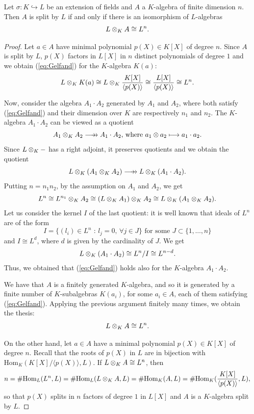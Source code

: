 \begin{proposition}
\label{prop:Gelfand}
    Let $\sigma:K\hookrightarrow L$ be an extension of fields and $A$ a $K$-algebra of finite dimension $n$. Then $A$ is split by $L$ if and only if there is an isomorphism of $L$-algebras
    \begin{equation}
    \label{eq:Gelfand}
        L\otimes_{K}A\cong L^n.    
    \end{equation}
    \begin{proof}
        Let $a\in A$ have minimal polynomial $p(X)\in K[X]$ of degree $n$. Since $A$ is split by $L$, $p(X)$ factors in $L[X]$ in $n$ distinct polynomials of degree $1$ and we obtain (\ref{eq:Gelfand}) for the $K$-algebra $K(a)$:
        \[ L\otimes_{K}K(a)\cong L\otimes_{K}\frac{K[X]}{\langle p(X)\rangle}\cong \frac{L[X]}{\langle p(X)\rangle}\cong L^n. \]
        
        Now, consider the algebra $A_1\cdot A_2$ generated by $A_1$ and $A_2$, where both satisfy (\ref{eq:Gelfand}) and their dimension over $K$ are respectively $n_1$ and $n_2$. The $K$-algebra $A_1\cdot A_2$ can be viewed as a quotient
        \[ A_1\tens{K}A_2\longrrightarrow A_1\cdot A_2\text{, where } a_1\otimes a_2\longmapsto a_1\cdot a_2. \]
        Since $L\otimes_{K}-$ has a right adjoint, it preserves quotients and we obtain the quotient
        \[ L\tens{K}(A_1\tens{K}A_2)\longrrightarrow L\tens{K}(A_1\cdot A_2). \]
        Putting $n = n_1n_2$, by the assumption on $A_1$ and $A_2$, we get
        \[ L^n \cong L^{n_1}\otimes_{K}A_2 \cong (L\otimes_{K}A_1)\otimes_{K}A_2 \cong L\otimes_{K}(A_1\otimes_{K}A_2). \]
        Let us consider the kernel $I$ of the last quotient: it is well known that ideals of $L^{n}$ are of the form
        \[ I =\{ (l_i)\in L^n\text{ : }l_j = 0\text{, }\forall j\in J \}\text{ for some }J\subset\{1,\dots, n\} \]
        and $I\cong L^{d}$, where $d$ is given by the cardinality of $J$.
        We get 
        \[ L\otimes_{K}(A_1\cdot A_2)\cong L^n/I\cong L^{n-d}. \]
        Thus, we obtained that (\ref{eq:Gelfand}) holds also for the $K$-algebra $A_1\cdot A_2$.

        We have that $A$ is a finitely generated $K$-algebra, and so it is generated by a finite number of $K$-subalgebras $K(a_i)$, for some $a_i\in A$, each of them satisfying (\ref{eq:Gelfand}). Applying the previous argument finitely many times, we obtain the thesis:
        \[ L\otimes_{K}A\cong L^n. \]

        On the other hand, let $a\in A$ have a minimal polynomial $p(X)\in K[X]$ of degree $n$. Recall that the roots of $p(X)$ in $L$ are in bijection with $\text{Hom}_K(K[X]/\langle p(X)\rangle,L)$. If $L\otimes_{K}A\cong L^n$, then 
        \[ n = \#\text{Hom}_L(L^n, L) = \#\text{Hom}_L(L\otimes_{K}A, L)=\# \text{Hom}_K(A, L) = \#\text{Hom}_K(\frac{K[X]}{\langle p(X)\rangle}, L), \]
        so that $p(X)$ splits in $n$ factors of degree $1$ in $L[X]$ and $A$ is a $K$-algebra split by $L$.
    \end{proof}
\end{proposition}

